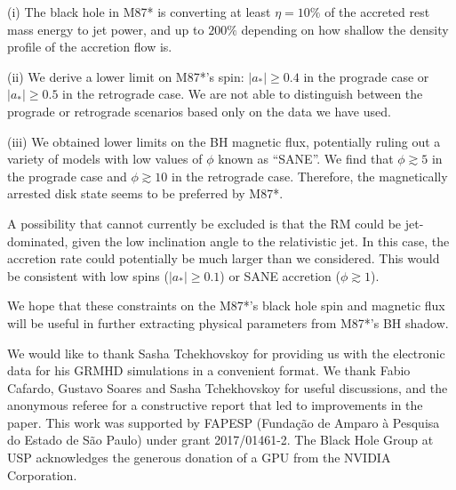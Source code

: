 \documentclass[twocolumn]{aastex62} %
\begin{document}
(i) The black hole in M87* is converting at least $\eta=10\%$ of the accreted rest mass energy to jet power, and up to $200\%$ depending on how shallow the density profile of the accretion flow is.

(ii) We derive a lower limit on M87*'s spin: $|a_*| \geq 0.4$ in the prograde case or $|a_*| \geq 0.5$ in the retrograde case. We are not able to distinguish between the prograde or retrograde scenarios based only on the data we have used.

(iii) We obtained lower limits on the BH magnetic flux, potentially ruling out a variety of models with low values of $\phi$ known as ``SANE''. We find that $\phi \gtrsim 5$ in the prograde case and $\phi \gtrsim 10$ in the retrograde case. Therefore, the magnetically arrested disk state seems to be preferred by M87*.

A possibility that cannot currently be excluded is that the RM could be jet-dominated, given the low inclination angle to the relativistic jet. In this case, the accretion rate could potentially be much larger than we considered. This would be consistent with low spins ($|a_*| \geq 0.1$) or SANE accretion ($\phi \gtrsim 1$). 

We hope that these constraints on the M87*'s black hole spin and magnetic flux will be useful in further extracting physical parameters from M87*'s BH shadow. 





\acknowledgments

We would like to thank Sasha Tchekhovskoy for providing us with the electronic data for his GRMHD simulations in a convenient format. We thank Fabio Cafardo, Gustavo Soares and Sasha Tchekhovskoy for useful discussions, and the anonymous referee for a constructive report that led to improvements in the paper.
This work was supported by FAPESP (Funda\c{c}\~ao de Amparo \`a Pesquisa do Estado de S\~ao Paulo) under grant 2017/01461-2. The Black Hole Group at USP acknowledges the generous donation of a GPU from the NVIDIA Corporation. %

\vspace{5mm}










\end{document}
